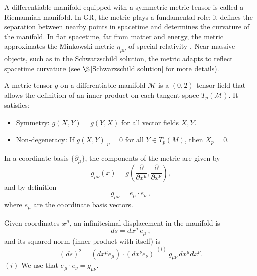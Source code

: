A differentiable manifold equipped with a symmetric metric tensor is called a Riemannian manifold. In GR, the metric plays a fundamental role: it defines the separation between nearby points in spacetime and determines the curvature of the manifold. In flat spacetime, far from matter and energy, the metric approximates the Minkowski metric $\eta_{\mu\nu}$ of special relativity \cite{llibreschutzGR}. Near massive objects, such as in the Schwarzschild solution, the metric adapts to reflect spacetime curvature (see $\S$\ref{Schwarzschild solution} for more details).

A metric tensor $g$ on a differentiable manifold $\mathcal{M}$ is a $(0,2)$ tensor field that allows the definition of an inner product on each tangent space $T_p(\mathcal{M})$. It satisfies:
\begin{itemize}
\item Symmetry: $g(X, Y) = g(Y, X)$ for all vector fields $X, Y$.
\item Non-degeneracy: If $g(X, Y)|_p = 0$ for all $Y \in T_p(M)$, then $X_p = 0$.
\end{itemize}
In a coordinate basis $\{ \partial_\mu \}$, the components of the metric are given by
\begin{equation}
g_{\mu\nu}(x) = g\left( \frac{\partial}{\partial x^\mu}, \frac{\partial}{\partial x^\nu} \right),
\end{equation}
and by definition
\begin{equation}
g_{\mu\nu} = e_\mu \cdot e_\nu \ ,
\end{equation}
where $e_\mu$ are the coordinate basis vectors.

Given coordinates $x^\mu$, an infinitesimal displacement in the manifold is
\begin{equation}
ds = dx^\mu\, e_\mu \ ,
\end{equation}
and its squared norm (inner product with itself) is
\begin{equation}
(ds)^2 = (dx^\mu e_\mu) \cdot (dx^\nu e_\nu) \overset{(i)}{=} g_{\mu\nu}\, dx^\mu dx^\nu.
\end{equation}
\noindent\hspace{1cm} $(i)$ We use that $e_\mu \cdot e_\nu = g_{\mu\nu}$.

